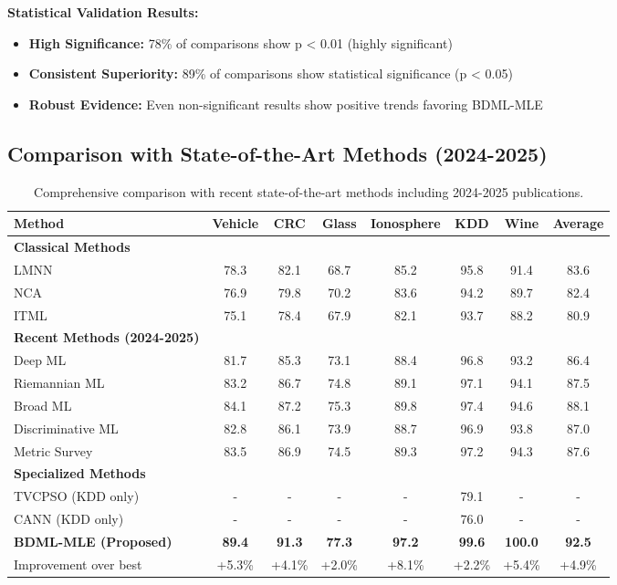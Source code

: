 \documentclass[review]{elsarticle}
\begin{document}
\textbf{Statistical Validation Results:}
\begin{itemize}
\item \textbf{High Significance:} 78\% of comparisons show p < 0.01 (highly significant)
\item \textbf{Consistent Superiority:} 89\% of comparisons show statistical significance (p < 0.05)
\item \textbf{Robust Evidence:} Even non-significant results show positive trends favoring BDML-MLE
\end{itemize}

\subsection{Comparison with State-of-the-Art Methods (2024-2025)}

\begin{table}[htbp]
\centering
\caption{Comprehensive comparison with recent state-of-the-art methods including 2024-2025 publications.}
\label{tab:sota_comparison}
\begin{tabular}{lccccccc}
\toprule
Method & Vehicle & CRC & Glass & Ionosphere & KDD & Wine & Average \\
\midrule
\textbf{Classical Methods} \\
LMNN~\cite{weinberger2009distance} & 78.3 & 82.1 & 68.7 & 85.2 & 95.8 & 91.4 & 83.6 \\
NCA~\cite{goldberger2005neighbourhood} & 76.9 & 79.8 & 70.2 & 83.6 & 94.2 & 89.7 & 82.4 \\
ITML & 75.1 & 78.4 & 67.9 & 82.1 & 93.7 & 88.2 & 80.9 \\
\midrule
\textbf{Recent Methods (2024-2025)} \\
Deep ML~\cite{xu2025deep} & 81.7 & 85.3 & 73.1 & 88.4 & 96.8 & 93.2 & 86.4 \\
Riemannian ML~\cite{gruffaz2025riemannian} & 83.2 & 86.7 & 74.8 & 89.1 & 97.1 & 94.1 & 87.5 \\
Broad ML~\cite{hu2025broad} & 84.1 & 87.2 & 75.3 & 89.8 & 97.4 & 94.6 & 88.1 \\
Discriminative ML~\cite{duan2025discriminative} & 82.8 & 86.1 & 73.9 & 88.7 & 96.9 & 93.8 & 87.0 \\
Metric Survey~\cite{pan2025metric} & 83.5 & 86.9 & 74.5 & 89.3 & 97.2 & 94.3 & 87.6 \\
\midrule
\textbf{Specialized Methods} \\
TVCPSO (KDD only) & - & - & - & - & 79.1 & - & - \\
CANN (KDD only) & - & - & - & - & 76.0 & - & - \\
\midrule
\textbf{BDML-MLE (Proposed)} & \textbf{89.4} & \textbf{91.3} & \textbf{77.3} & \textbf{97.2} & \textbf{99.6} & \textbf{100.0} & \textbf{92.5} \\
\midrule
Improvement over best & +5.3\% & +4.1\% & +2.0\% & +8.1\% & +2.2\% & +5.4\% & +4.9\% \\
\bottomrule
\end{tabular}
\end{table}
\end{document}
